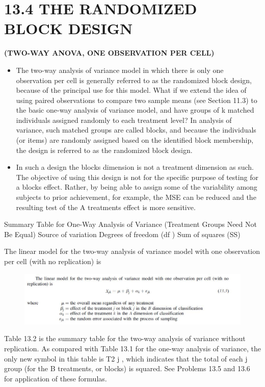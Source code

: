 \documentclass[]{article}
\begin{document}
\section{13.4 THE RANDOMIZED BLOCK DESIGN}
\noindent \textbf{(TWO-WAY ANOVA, ONE OBSERVATION PER CELL)}
\begin{itemize}
\item The two-way analysis of variance model in which there is only one observation per cell is generally
referred to as the randomized block design, because of the principal use for this model. What if we extend the
idea of using paired observations to compare two sample means (see Section 11.3) to the basic one-way analysis
of variance model, and have groups of k matched individuals assigned randomly to each treatment level? In
analysis of variance, such matched groups are called blocks, and because the individuals (or items) are
randomly assigned based on the identified block membership, the design is referred to as the randomized block
design. 
\item In such a design the blocks dimension is not a treatment dimension as such. The objective of using this
design is not for the specific purpose of testing for a blocks effect. Rather, by being able to assign some of the
variability among subjects to prior achievement, for example, the MSE can be reduced and the resulting test of
the A treatments effect is more sensitive.
\end{itemize}

Summary Table for One-Way Analysis of Variance (Treatment Groups Need Not Be Equal)
Source of variation
Degrees of freedom
(df )
Sum of squares
(SS)

The linear model for the two-way analysis of variance model with one observation per cell (with no
replication) is

\begin{figure}
\centering
\includegraphics[width=1.1\linewidth]{TwoWayANOVA-Equation1}
\end{figure}

Table 13.2 is the summary table for the two-way analysis of variance without replication. As compared
with Table 13.1 for the one-way analysis of variance, the only new symbol in this table is T2
j , which indicates
that the total of each j group (for the B treatments, or blocks) is squared. See Problems 13.5 and 13.6 for
application of these formulas.
\end{document}

